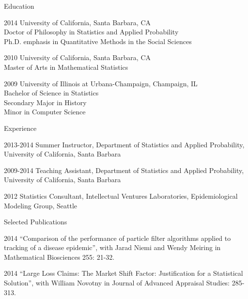   \begin{vitae}

    {\small
      \begin{vitaesection}{Education}
        \vspace{-0.1cm}
      \item [2014] University of California, Santa Barbara, CA \\
      Doctor of Philosophy in Statistics and Applied Probability \\
      Ph.D. emphasis in Quantitative Methods in the Social Sciences
      \item [2010] University of California, Santa Barbara, CA \\
      Master of Arts in Mathematical Statistics
      \item [2009] University of Illinois at Urbana-Champaign, Champaign, IL \\
      Bachelor of Science in Statistics \\
      Secondary Major in History \\
      Minor in Computer Science
      \end{vitaesection}

      \begin{vitaesection}{Experience}
        \vspace{-0.1cm}
      \item [2013-2014] Summer Instructor, Department of Statistics and Applied Probability, University of California, Santa Barbara
      \item [2009-2014] Teaching Assistant, Department of Statistics and Applied Probability, University of California, Santa Barbara
      \item [2012] Statistics Consultant, Intellectual Ventures Laboratories, Epidemiological Modeling Group, Seattle
      \end{vitaesection}

      \begin{vitaesection}{Selected Publications}
        \vspace{-0.1cm}
      \item [2014] ``Comparison of the performance of particle filter algorithms applied to tracking of a disease epidemic'', with Jarad Niemi and Wendy Meiring in Mathematical Biosciences 255: 21-32.
      \item [2014] ``Large Loss Claims: The Market Shift Factor: Justification for a Statistical Solution'', with William Novotny in Journal of Advanced Appraisal Studies: 285-313.
        \vspace{0.3cm}
      \end{vitaesection}

}
\end{vitae}
